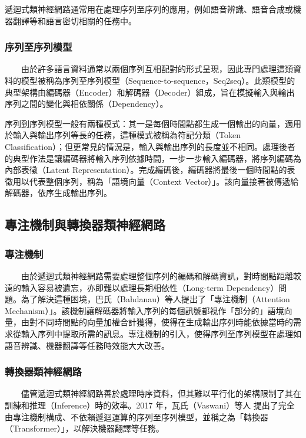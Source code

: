         遞迴式類神經網路通常用在處理序列至序列的應用，例如語音辨識、語音合成或機器翻譯等和語言密切相關的任務中。

\subsubsection{序列至序列模型}

　　由於許多語言資料通常以兩個序列互相配對的形式呈現，因此專門處理這類資料的模型被稱為序列至序列模型（Sequence-to-sequence，Seq2seq）\cite{sutskever2014sequence}。此類模型的典型架構由編碼器（Encoder）和解碼器（Decoder）組成，旨在模擬輸入與輸出序列之間的變化與相依關係（Dependency）。

        序列到序列模型一般有兩種模式：其一是每個時間點都生成一個輸出的向量，適用於輸入與輸出序列等長的任務，這種模式被稱為符記分類（Token Classification）；但更常見的情況是，輸入與輸出序列的長度並不相同。處理後者的典型作法是讓編碼器將輸入序列依據時間，一步一步輸入編碼器，將序列編碼為內部表徵（Latent Representation）。完成編碼後，編碼器將最後一個時間點的表徵用以代表整個序列，稱為「語境向量（Context Vector）」。該向量接著被傳遞給解碼器，依序生成輸出序列。

\subsection{專注機制與轉換器類神經網路}

\subsubsection{專注機制}

　　由於遞迴式類神經網路需要處理整個序列的編碼和解碼資訊，對時間點距離較遠的輸入容易被遺忘，亦即難以處理長期相依性（Long-term Dependency）問題。為了解決這種困境，巴氏（Bahdanau）等人提出了「專注機制（Attention Mechanism）」\cite{bahdanau2014neural}。該機制讓解碼器將輸入序列的每個訊號都視作「部分的」語境向量，由對不同時間點的向量加權合計獲得，使得在生成輸出序列時能依據當時的需求從輸入序列中提取所需的訊息。專注機制的引入，使得序列至序列模型在處理如語音辨識、機器翻譯等任務時效能大大改善。

\subsubsection{轉換器類神經網路}

　　儘管遞迴式類神經網路善於處理時序資料，但其難以平行化的架構限制了其在訓練和推理（Inference）時的效率。2017 年，瓦氏（Vaswani）等人 \cite{vaswani2017attention} 提出了完全由專注機制構成、不依賴遞迴運算的序列至序列模型，並稱之為「轉換器（Transformer）」，以解決機器翻譯等任務。


